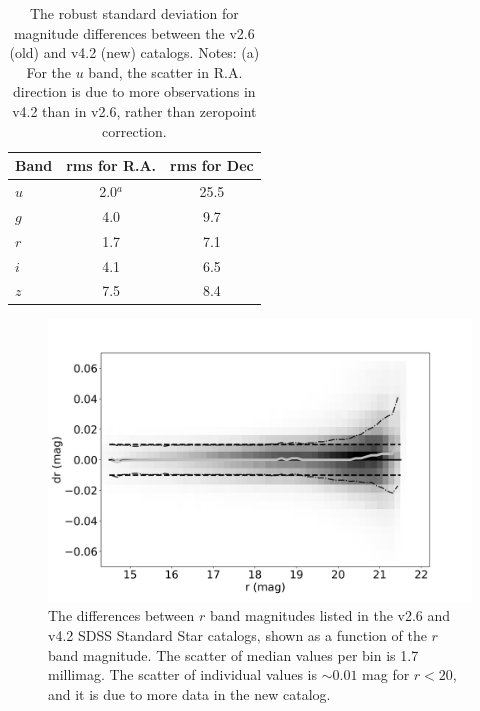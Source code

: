\documentclass[fleqn,usenatbib]{mnras}
\begin{document}
\begin{table}
	\centering
	\begin{tabular}{l|c|c} %
		\hline
		Band & rms for R.A. & rms for Dec \\
		\hline
       $u$        &        2.0$^a$    &    25.5      \\
       $g$        &        4.0    &      9.7      \\  
       $r$         &        1.7    &      7.1      \\  
       $i$         &        4.1    &      6.5      \\ 
       $z$        &        7.5    &      8.4      \\ 
		\hline
	\end{tabular}
	\caption{The robust standard deviation for magnitude differences between the v2.6 (old) and v4.2 (new) catalogs. Notes: (a) For the $u$ band, the scatter in R.A. direction is due to more observations in v4.2 than in v2.6, rather than zeropoint correction.}
	\label{tab:oldnewRMS}
\end{table}


\begin{figure}
    \centering\includegraphics[width=0.95\columnwidth]{figures/testV26vsV42_r_dr_r_mag_Hess.png} 
\caption{The differences between $r$ band magnitudes listed in the v2.6 and v4.2 
SDSS Standard Star catalogs,  shown as a function of the $r$ band magnitude. The 
scatter of median values per bin is 1.7 millimag. The scatter of individual values is 
$\sim0.01$ mag for $r<20$, and it is due to more data in the new catalog.} 
\label{fig:v26v34drr}
\end{figure}
\end{document}
